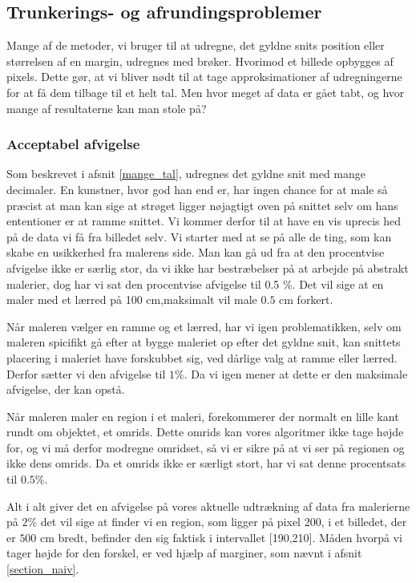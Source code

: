 \subsection*{Trunkerings- og afrundingsproblemer}
Mange af de metoder, vi bruger til at udregne, det gyldne
snits position eller størrelsen af en margin, udregnes med brøker. Hvorimod et
billede opbygges af pixels. Dette gør, at vi bliver nødt til at tage
approksimationer af udregningerne for at få dem tilbage til et helt tal.
Men hvor meget af data er gået tabt, og hvor mange af resultaterne kan
man stole på?

\subsubsection{Acceptabel afvigelse}
Som beskrevet i afsnit \ref{mange_tal}, udregnes
det gyldne snit med mange decimaler. En kunstner, hvor god han end er,
har ingen chance for at male så præcist at man kan sige at strøget
ligger nøjagtigt oven på snittet selv om hans ententioner er at ramme
snittet. Vi kommer derfor til at have en vis uprecis hed på de data vi
få fra billedet selv. Vi starter med at se på alle de ting, som kan
skabe en usikkerhed fra malerens side. Man kan gå ud fra at den
procentvise afvigelse ikke er særlig stor, da vi ikke har bestræbelser
på at arbejde på abstrakt malerier, dog har vi sat den procentvise
afvigelse til 0.5 \%. Det vil sige at en maler med et lærred på 100
cm,maksimalt vil male $0.5$ cm forkert.

Når maleren vælger en ramme og et lærred, har vi igen problematikken,
selv om maleren spicifikt gå efter at bygge maleriet op efter det gyldne
snit, kan snittets placering i maleriet have forskubbet sig, ved dårlige
valg at ramme eller lærred. Derfor sætter vi den afvigelse til $1\%$. Da
vi igen mener at dette er den maksimale afvigelse, der kan opstå.

Når maleren maler en region i et maleri, forekommerer der normalt en
lille kant rundt om objektet, et omrids. Dette omrids kan vores
algoritmer ikke tage højde for, og vi må derfor modregne omridset, så vi
er sikre på at vi ser på regionen og ikke dens omrids. Da et omrids ikke
er særligt stort, har vi sat denne procentsats til $0.5\%$. 

Alt i alt giver det en afvigelse på vores aktuelle udtrækning af data
fra malerierne på $2\%$ det vil sige at finder vi en region, som ligger
på pixel 200, i et billedet, der er $500$ cm bredt, befinder den sig
faktisk i intervallet [190,210]. Måden hvorpå vi tager højde for den
forskel, er ved hjælp af marginer, som nævnt i afsnit
\ref{section_naiv}.

